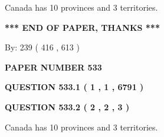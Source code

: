 \documentclass[12pt]{article}
\begin{document}
  
 
 
\noindent{}
 
 
Canada has 10  provinces and 3 territories.
 
 
 
 
   
   
 \vspace{0.2in}
 
   
   
   
   
\vspace{1.0in} 
{\textbf{\large{ *** END OF PAPER, THANKS *** }}} 
   
   
\hspace{1.0in} By: 
 239 ( 416 ,  613 )
   
   
   
   
\newpage 
\setcounter{page}{ 
   533001 } 
   
   
   
   
 {\textbf{ \Large{ PAPER NUMBER  533  }}}
   
   
\vspace{0.2in}
   
   
   
   
   
   
 \vspace{0.2in}
 
 
 
 
   
   
  
\vspace{0.2in}
  
{\textbf{\Large{QUESTION
533.1 
 ( 1 , 1 , 6791 )
}}}
  
  
  
\vspace{0.2in}
  
{\textbf{\Large{QUESTION
533.2 
 ( 2 , 2 , 3 )
}}}
  
  
 
 
\noindent{}
 
 
Canada has 10  provinces and 3 territories.
 
 
 
 
   
   
 \vspace{0.2in}
 
\end{document}
